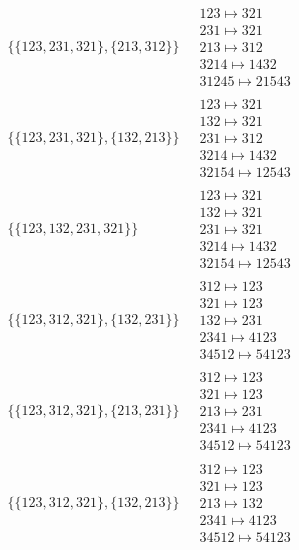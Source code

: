 \begin{scriptsize}
\begin{align}
\begin{matrix}
\end{matrix}
\\
\{\{123, 231, 321\}, \{213, 312\}\}
\ 
&
\begin{matrix}
123 \mapsto 321\\231 \mapsto 321\\213 \mapsto 312\\3214 \mapsto 1432\\31245 \mapsto 21543
\end{matrix}
\\
\{\{123, 231, 321\}, \{132, 213\}\}
\ 
&
\begin{matrix}
123 \mapsto 321\\132 \mapsto 321\\231 \mapsto 312\\3214 \mapsto 1432\\32154 \mapsto 12543
\end{matrix}
\\
\{\{123, 132, 231, 321\}\}
\ 
&
\begin{matrix}
123 \mapsto 321\\132 \mapsto 321\\231 \mapsto 321\\3214 \mapsto 1432\\32154 \mapsto 12543
\end{matrix}
\\
\{\{123, 312, 321\}, \{132, 231\}\}
\ 
&
\begin{matrix}
312 \mapsto 123\\321 \mapsto 123\\132 \mapsto 231\\2341 \mapsto 4123\\34512 \mapsto 54123
\end{matrix}
\\
\{\{123, 312, 321\}, \{213, 231\}\}
\ 
&
\begin{matrix}
312 \mapsto 123\\321 \mapsto 123\\213 \mapsto 231\\2341 \mapsto 4123\\34512 \mapsto 54123
\end{matrix}
\\
\{\{123, 312, 321\}, \{132, 213\}\}
\ 
&
\begin{matrix}
312 \mapsto 123\\321 \mapsto 123\\213 \mapsto 132\\2341 \mapsto 4123\\34512 \mapsto 54123

\end{matrix}
\end{align}
\end{scriptsize}
